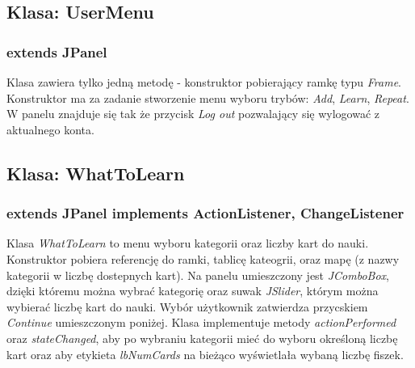 \documentclass[11pt]{article}
\begin{document}
\subsection{Klasa: UserMenu}
\subsubsection*{extends JPanel}

Klasa zawiera tylko jedną metodę - konstruktor pobierający ramkę typu \textit{Frame}. Konstruktor ma za zadanie stworzenie menu wyboru trybów: \textit{Add}, \textit{Learn}, \textit{Repeat}. W panelu znajduje się tak że przycisk \textit{Log out} pozwalający się wylogować z aktualnego konta.

\subsection{Klasa: WhatToLearn}
\subsubsection*{extends JPanel implements ActionListener, ChangeListener}

Klasa \textit{WhatToLearn} to menu wyboru kategorii oraz liczby kart do nauki. Konstruktor pobiera referencję do ramki, tablicę kateogrii, oraz mapę (z nazwy kategorii w liczbę dostepnych kart). Na panelu umieszczony jest \textit{JComboBox}, dzięki któremu można wybrać kategorię oraz suwak \textit{JSlider}, którym można wybierać liczbę kart do nauki. Wybór użytkownik zatwierdza przycskiem \textit{Continue} umieszczonym poniżej. Klasa implementuje metody \textit{actionPerformed} oraz \textit{stateChanged}, aby po wybraniu kategorii mieć do wyboru określoną liczbę kart oraz aby etykieta \textit{lbNumCards} na bieżąco wyświetlała wybaną liczbę fiszek.
\end{document}
